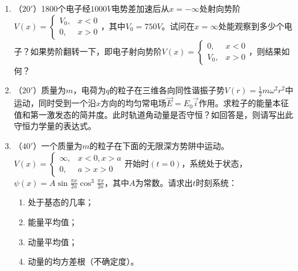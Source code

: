 

\begin{enumerate}
	\item
（$20'$）1800个电子经$1000V$电势差加速后从$x=-\infty$处射向势阶$V(x)=\begin{cases}V_0,&x<0\\0,&x>0\end{cases}$，其中$V_0=750V$。试问在$x=\infty$处能观察到多少个电子？如果势阶翻转一下，即电子射向势阶$V(x)=\begin{cases}0,&x<0\\V_0,&x>0\end{cases}$，则结果如何？


\banswer{
	
}


\item 
（$20'$）质量为$m$，电荷为$q$的粒子在三维各向同性谐振子势$V(r)=\frac{1}{2}m\omega^2r^2$中运动，同时受到一个沿$x$方向的均匀常电场$\vec{E}=E_0\vec{i}$作用。求粒子的能量本征值和第一激发态的简并度。此时轨道角动量是否守恒？如回答是，则请写出此守恒力学量的表达式。


\banswer{
	
}


\item 
（$40'$）一个质量为$m$的粒子在下面的无限深方势阱中运动。$V(x)=\begin{cases}\infty,&x<0,x>a\\ 0,&a>x>0\end{cases}$开始时$(t=0)$，系统处于状态，$\psi(x)=A\sin\frac{\pi x}{2a}\cos^3\frac{\pi x}{2a}$，其中$A$为常数。请求出$t$时刻系统：
\begin{enumerate}
	\item
处于基态的几率；
\item 
能量平均值；
\item 
动量平均值；
\item 
动量的均方差根（不确定度）。
	
\end{enumerate}



\end{enumerate}
